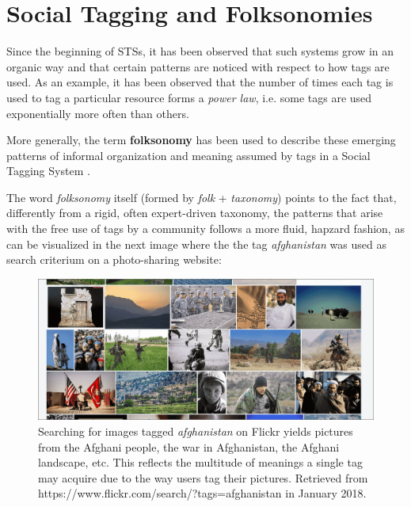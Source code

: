 \cite{wal_2005}

\section{Social Tagging and Folksonomies}

Since the beginning of STSs, it has been observed that such systems grow in an organic way and that certain patterns are noticed with respect to how tags are used. As an example, it has been observed \citep{halpin_etal_2006} that the number of times each tag is used to tag a particular resource forms a \textit{power law}, i.e. some tags are used exponentially more often than others.

More generally, the term \textbf{folksonomy} has been used to describe  these emerging patterns of informal organization and meaning assumed by tags in a Social Tagging System \citep{mathes_2004,wal_2005_folksonomy}.

The word \textit{folksonomy} itself (formed by \textit{folk} + \textit{taxonomy}) points to the fact that, differently from a rigid, often expert-driven taxonomy, the patterns that arise with the free use of tags by a community follows a more fluid, hapzard fashion, as can be  visualized in the next image where the the tag \textit{afghanistan} was used as search criterium on a photo-sharing website: 

\begin{figure}[!h]
    \centering
    \includegraphics[width=\textwidth]{chapters/02_social_tagging/images/flickr_afghanistan.png}
    \caption{Searching for images tagged \textit{afghanistan} on Flickr yields pictures from the Afghani people, the war in Afghanistan, the Afghani landscape, etc. This reflects the multitude of meanings a single tag may acquire due to the way users tag their pictures. Retrieved from https://www.flickr.com/search/?tags=afghanistan in January 2018.}
    \label{fig:afghanistan}
\end{figure}

